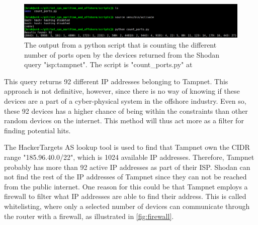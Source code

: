 \begin{figure} [H]
    \centering
    \includegraphics[scale=0.35]{Figurer/python_ports.png}
    \caption{The output from a python script that is counting the different number of ports open by the devices returned from the Shodan query "isp:tampnet". The script is "count\_ports.py" at \cite{scripts}}
    \label{fig:tampnet_ports}
\end{figure}

This query returns 92 different IP addresses belonging to Tampnet. This approach is not definitive, however, since there is no way of knowing if these devices are a part of a cyber-physical system in the offshore industry. Even so, these 92 devices has a higher chance of being within the constraints than other random devices on the internet. This method will thus act more as a filter for finding potential hits. 

The HackerTargets AS lookup tool \cite{asip_lookup} is used to find that Tampnet own the CIDR range "185.96.40.0/22", which is 1024 available IP addresses. \cite{CIDR_table} Therefore, Tampnet probably has more than 92 active IP addresses as part of their ISP. Shodan can not find the rest of the IP addresses of Tampnet since they can not be reached from the public internet. One reason for this could be that Tampnet employs a firewall to filter what IP addresses are able to find their address. This is called whitelisting, where only a selected number of devices can communicate through the router with a firewall, as illustrated in \cref{fig:firewall}.


